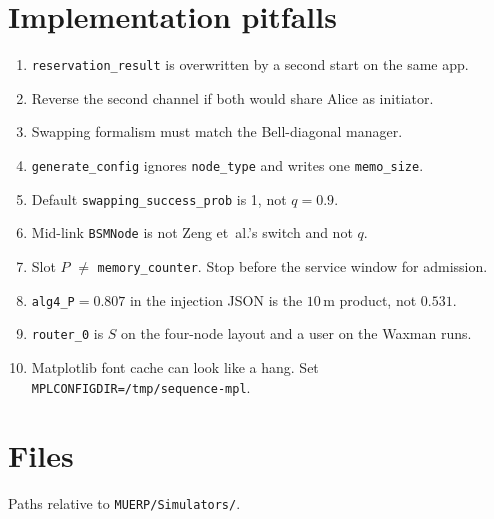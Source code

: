\documentclass[11pt]{article}
\begin{document}
\section{Implementation pitfalls}

\begin{enumerate}
\item \texttt{reservation\_result} is overwritten by a second start on the same app.
\item Reverse the second channel if both would share Alice as initiator.
\item Swapping formalism must match the Bell-diagonal manager.
\item \texttt{generate\_config} ignores \texttt{node\_type} and writes one \texttt{memo\_size}.
\item Default \texttt{swapping\_success\_prob} is 1, not $q=0.9$.
\item Mid-link \texttt{BSMNode} is not Zeng et~al.'s switch and not $q$.
\item Slot $P$ $\neq$ \texttt{memory\_counter}. Stop before the service window for admission.
\item \texttt{alg4\_P}${}=0.807$ in the injection JSON is the $10$\,m product, not $0.531$.
\item \texttt{router\_0} is $S$ on the four-node layout and a user on the Waxman runs.
\item Matplotlib font cache can look like a hang. Set \texttt{MPLCONFIGDIR=/tmp/sequence-mpl}.
\end{enumerate}

\section{Files}

Paths relative to \texttt{MUERP/Simulators/}.
\end{document}
